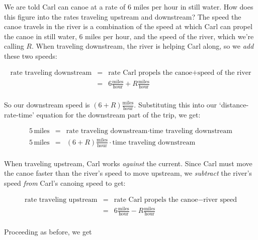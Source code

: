 \begin{ex}
We are told Carl can canoe at a  rate of $6$ miles per hour in still water.  How does this figure into the rates traveling upstream and downstream?  The speed the canoe travels in the river is a combination of the speed at which Carl can propel the canoe in still water, 6 miles per hour,  and the speed of the river, which we're calling $R$. When traveling downstream, the river is helping Carl along, so we \textit{add} these two speeds: 

\[ \begin{array}{rcl}

\text{rate traveling downstream} & = & \text{rate Carl propels the canoe} + \text{speed of the river} \\

 & = & 6 \frac{\text{miles}}{\text{hour}} + R \frac{\text{miles}}{\text{hour}} \\ \end{array} \]
 
 So our downstream speed is $(6+R) \frac{\text{miles}}{\text{hour}}$.  Substituting this into our `distance-rate-time' equation for the downstream part of the trip, we get:
 
 \[ \begin{array}{rcl}

5 \, \text{miles} & = & \text{rate traveling downstream} \cdot \text{time traveling downstream} \\ 

5 \, \text{miles} & = & (6+R) \frac{\text{miles}}{\text{hour}} \cdot \text{time traveling downstream} \\ 	\end{array} \]

 When traveling upstream, Carl works \textit{against} the current.  Since Carl must move the canoe faster than the river's speed to move upstream,  we \textit{subtract} the river's speed \textit{from} Carl's canoing speed to get:
 
 \[ \begin{array}{rcl}

\text{rate traveling upstream} & = & \text{rate Carl propels the canoe} - \text{river speed} \\

 & = & 6 \frac{\text{miles}}{\text{hour}} - R \frac{\text{miles}}{\text{hour}} \\ \end{array} \]
 
Proceeding as before, we get
 
 \[ \begin{array}{rcl}


\end{array}\]
\end{ex}
